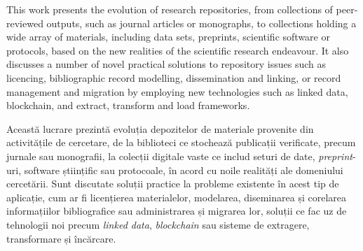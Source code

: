 This work presents the evolution of research repositories, from collections of peer-reviewed outputs, such as journal articles or monographs, to collections holding a wide array of materials, including data sets, preprints, scientific software or protocols, based on the new realities of the scientific research endeavour. It also discusses a number of novel practical solutions to repository issues such as licencing, bibliographic record modelling, dissemination and linking, or record management and migration by employing new technologies such as linked data, blockchain, and extract, transform and load frameworks.\\\par


\noindent Această lucrare prezintă evoluția depozitelor de materiale provenite din activitățile de cercetare, de la biblioteci ce stochează publicații verificate, precum jurnale sau monografii, la colecții digitale vaste ce includ seturi de date, \emph{preprint}-uri, software științific sau protocoale, în acord cu noile realități ale domeniului cercetării. Sunt discutate soluții practice la probleme existente în acest tip de aplicație, cum ar fi licențierea materialelor, modelarea, diseminarea și corelarea informațiilor bibliografice sau administrarea și migrarea lor, soluții ce fac uz de tehnologii noi precum \emph{linked data}, \emph{blockchain} sau sisteme de extragere, transformare și încărcare.  